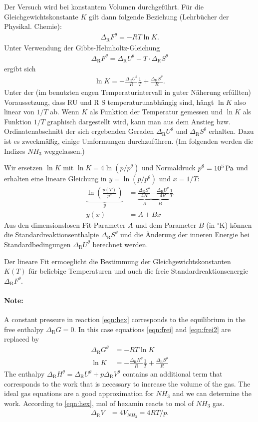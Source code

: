 \documentclass[english,twocolumn,DIV21,a4,10pt]{scrartcl}
\newcommand{\dr}{\Delta_\textrm{R}}
\begin{document}
Der Versuch wird bei konstantem Volumen durchgeführt. Für die
Gleichgewichtskonstante $K$ gilt dann folgende Beziehung (Lehrbücher
der Physikal. Chemie):
\begin{align}
  \label{eqn:frei}
  \dr F^\theta = -RT\ln K.
\end{align}
Unter Verwendung der Gibbs-Helmholtz-Gleichung
\begin{align}
  \label{eqn:frei2}
  \dr F^\theta = \dr U^\theta - T \cdot \dr S^\theta
\end{align}
ergibt sich
\begin{align}
  \ln K = -\frac{\dr U^\theta}{R}\frac{1}{T} + \frac{\dr S^\theta}{R}.
\end{align}
Unter der (im benutzten engen Temperaturintervall in guter Näherung
erfüllten) Voraussetzung, dass RU und R S temperaturunabhängig sind,
hängt $\ln K$ also linear von $1/T$ ab. Wenn $K$ als Funktion der
Temperatur gemessen und $\ln K$ als Funktion $1/T$ graphisch
dargestellt wird, kann man aus dem Anstieg bzw. Ordinatenabschnitt der
sich ergebenden Geraden $\dr U^\theta$ und $\dr S^\theta$
erhalten. Dazu ist es zweckmäßig, einige Umformungen
durchzuführen. (Im folgenden werden die Indizes $NH_3$ weggelassen.)

Wir ersetzen $\ln K$ mit $\ln K=4\ln(p/p^\theta)$ und Normaldruck
$p^\theta = \unit[10^5]{Pa}$ und erhalten eine lineare Gleichung in $y
= \ln(p/p^\theta)$ und $x=1/T$:
\begin{align}
  \label{eqn:fit}
  \underbrace{\ln \left(\frac{p(T)}{p^\theta}\right)}_y &= 
  \underbrace{\frac{\dr S^\theta}{4R}}_A \underbrace{-\frac{\dr U^\theta}{4R}}_B
  \frac{1}{T} \\
  y(x) &= A+B x
\end{align}
Aus den dimensionslosen Fit-Parameter $A$ und dem Parameter $B$ (in
${}^\circ\textrm{K}$) können die Standardreaktionsenthalpie $\dr
S^\theta$ und die \"Anderung der inneren Energie bei
Standardbedingungen $\dr U^\theta$ berechnet werden.

Der lineare Fit ermoeglicht die Bestimmung der
Gleichgewichtskonstanten $K(T)$ f\"ur beliebige Temperaturen und auch
die freie Standardreaktionsenergie $\dr F^\theta$.

\paragraph{Note:}
A constant pressure in reaction \ref{eqn:hex} corresponds to the
equilibrium in the free enthalpy $\dr G=0$. In this case equations
\eqref{eqn:frei} and \eqref{eqn:frei2} are replaced by
\begin{align}
  \dr G^\theta &= -RT \ln K \\
  \ln K &= - \frac{\dr H^\theta}{R} \frac{1}{T} + \frac{\dr S^\theta}{R}
\end{align}
The enthalpy $\dr H^\theta=\dr U^\theta + p \dr V^\theta$ contains an
additional term that corresponds to the work that is necessary to
increase the volume of the gas. The ideal gas equations are a good
approximation for $NH_3$ and we can determine the work. According to
\eqref{eqn:hex}, \unit[1]{mol} of hexamin reacts to \unit[4]{mol} of
$NH_3$ gas.
\begin{align}
  \dr V&= 4V_{NH_3}=4RT/p.
\end{align}
\end{document}

